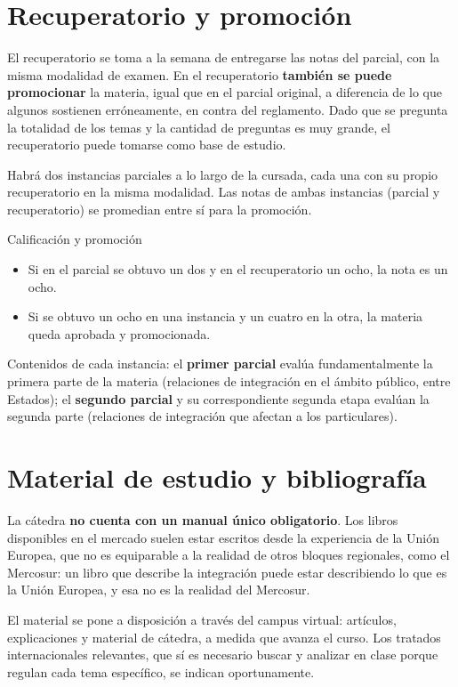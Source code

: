 \documentclass[12pt,oneside]{book}
\begin{document}
\section{Recuperatorio y promoción}

El recuperatorio se toma a la semana de entregarse las notas del parcial, con la misma modalidad de examen. En el recuperatorio \textbf{también se puede promocionar} la materia, igual que en el parcial original, a diferencia de lo que algunos sostienen erróneamente, en contra del reglamento. Dado que se pregunta la totalidad de los temas y la cantidad de preguntas es muy grande, el recuperatorio puede tomarse como base de estudio.

Habrá dos instancias parciales a lo largo de la cursada, cada una con su propio recuperatorio en la misma modalidad. Las notas de ambas instancias (parcial y recuperatorio) se promedian entre sí para la promoción.

\begin{example}{Calificación y promoción}
\begin{itemize}
    \item Si en el parcial se obtuvo un dos y en el recuperatorio un ocho, la nota es un ocho.
    \item Si se obtuvo un ocho en una instancia y un cuatro en la otra, la materia queda aprobada y promocionada.
\end{itemize}
\end{example}

Contenidos de cada instancia: el \textbf{primer parcial} evalúa fundamentalmente la primera parte de la materia (relaciones de integración en el ámbito público, entre Estados); el \textbf{segundo parcial} y su correspondiente segunda etapa evalúan la segunda parte (relaciones de integración que afectan a los particulares).

\section{Material de estudio y bibliografía}

La cátedra \textbf{no cuenta con un manual único obligatorio}. Los libros disponibles en el mercado suelen estar escritos desde la experiencia de la Unión Europea, que no es equiparable a la realidad de otros bloques regionales, como el Mercosur: un libro que describe la integración puede estar describiendo lo que es la Unión Europea, y esa no es la realidad del Mercosur.

El material se pone a disposición a través del campus virtual: artículos, explicaciones y material de cátedra, a medida que avanza el curso. Los tratados internacionales relevantes, que sí es necesario buscar y analizar en clase porque regulan cada tema específico, se indican oportunamente.
\end{document}
